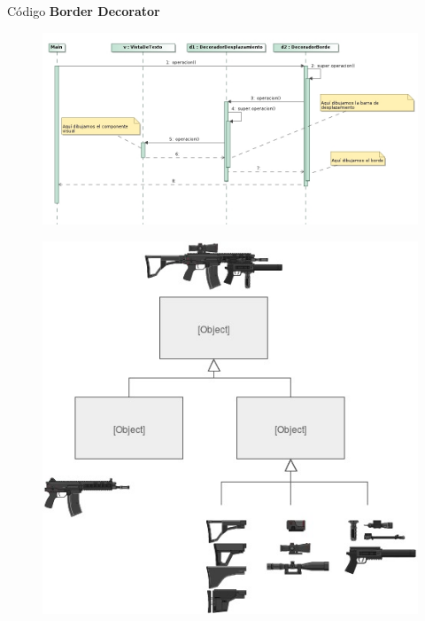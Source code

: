 \documentclass{beamer}
\begin{document}
\begin{frame}{Código}	
 \lstDD
 \textbf{Border Decorator}
 \lstBD
\end{frame}

\begin{frame}
 \begin{figure}
  \centering
  \includegraphics[scale=0.35]{2.jpg}
 \end{figure}

\end{frame}

\begin{frame}
 \begin{figure}
  \centering
  \includegraphics[scale=0.5]{3.jpg}
 \end{figure}
\end{frame}
\end{document}
